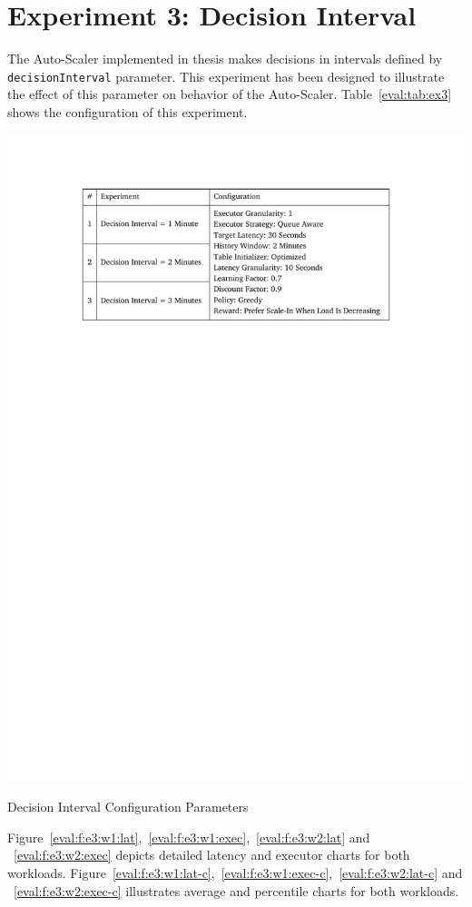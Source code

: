 \section{Experiment 3: Decision Interval}
The Auto-Scaler implemented in thesis makes decisions in intervals defined by \lstinline|decisionInterval| parameter. This experiment has been designed to illustrate the effect of this parameter on behavior of the Auto-Scaler. Table~\ref{eval:tab:ex3} shows the configuration of this experiment.
\begin{table}[h]
    \includegraphics[clip,trim=3.3cm 21.18cm 3.25cm 2.5cm]{tables/ex3.pdf}
    \centering
    \caption{Decision Interval Configuration Parameters}
    \label{eval:tab:ex3}
\end{table}

Figure~\ref{eval:f:e3:w1:lat},~\ref{eval:f:e3:w1:exec},~\ref{eval:f:e3:w2:lat} and ~\ref{eval:f:e3:w2:exec} depicts detailed latency and executor charts for both workloads. Figure~\ref{eval:f:e3:w1:lat-c},~\ref{eval:f:e3:w1:exec-c},~\ref{eval:f:e3:w2:lat-c} and ~\ref{eval:f:e3:w2:exec-c} illustrates average and percentile charts for both workloads.

